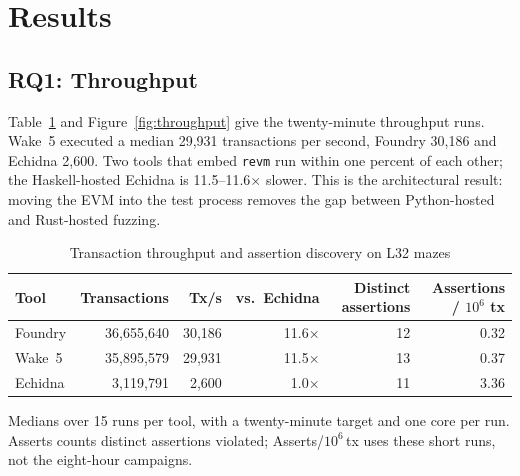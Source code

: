 \documentclass[11pt,a4paper]{article}
\newcommand{\wake}{Wake}
\newcommand{\revm}{\texttt{revm}}
\newcommand{\tablenote}[1]{\par\smallskip\begin{minipage}{\linewidth}\footnotesize\raggedright #1\end{minipage}}
\begin{document}
\section{Results}
\label{sec:results}

\subsection{RQ1: Throughput}
\label{sec:throughput}

Table~\ref{tab:throughput} and Figure~\ref{fig:throughput} give the twenty-minute throughput runs. \wake{}~5 executed a median 29{,}931 transactions per second, Foundry 30{,}186 and Echidna 2{,}600. Two tools that embed \revm{} run within one percent of each other; the Haskell-hosted Echidna is 11.5--11.6$\times$ slower. This is the architectural result: moving the EVM into the test process removes the gap between Python-hosted and Rust-hosted fuzzing.

\begin{table}[t]
\centering\small
\caption{Transaction throughput and assertion discovery on L32 mazes}
\label{tab:throughput}
\begin{tabular}{@{}lrrrrr@{}}
\toprule
Tool & Transactions & Tx/s & vs.\ Echidna & Distinct assertions & Assertions / $10^6$ tx \\
\midrule
Foundry & 36{,}655{,}640 & 30{,}186 & 11.6$\times$ & 12 & 0.32 \\
\wake{}~5 & 35{,}895{,}579 & 29{,}931 & 11.5$\times$ & 13 & 0.37 \\
Echidna & 3{,}119{,}791 & 2{,}600 & 1.0$\times$ & 11 & 3.36 \\
\bottomrule
\end{tabular}
\tablenote{Medians over 15 runs per tool, with a twenty-minute target and one core per run. Asserts counts distinct assertions violated; Asserts/$10^6$\,tx uses these short runs, not the eight-hour campaigns.}
\end{table}
\end{document}
